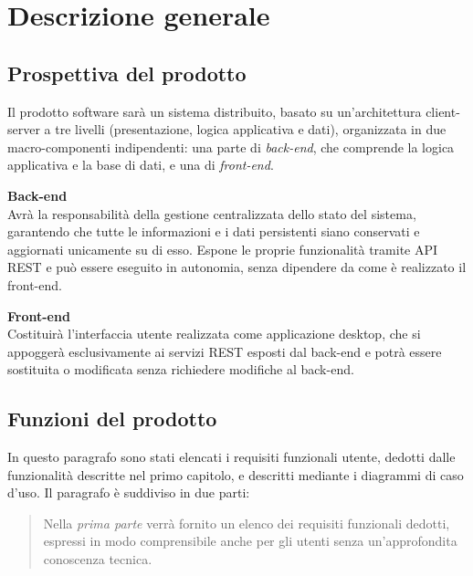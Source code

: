 \chapter{Descrizione generale} %


\section{Prospettiva del prodotto}

Il prodotto software sarà un sistema distribuito, basato su un'architettura client-server a tre livelli (presentazione, logica applicativa e dati), organizzata in due macro-componenti indipendenti: una parte di \textit{back-end}, che comprende la logica applicativa e la base di dati, e una di \textit{front-end}. 

\textbf{Back-end} \\
Avrà la responsabilità della gestione centralizzata dello stato del sistema, garantendo che tutte le informazioni e i dati persistenti siano conservati e aggiornati unicamente su di esso. Espone le proprie funzionalità tramite API REST e può essere eseguito in autonomia, senza dipendere da come è realizzato il front-end.

\textbf{Front-end} \\
Costituirà l'interfaccia utente realizzata come applicazione desktop, che si appoggerà esclusivamente ai servizi REST esposti dal back-end e potrà essere sostituita o modificata senza richiedere modifiche al back-end.

\section{Funzioni del prodotto}
In questo paragrafo sono stati elencati i requisiti funzionali utente, dedotti dalle funzionalità descritte nel primo capitolo, e descritti mediante i diagrammi di caso d'uso.
Il paragrafo è suddiviso in due parti:

\begin{quote}
Nella \textit{prima parte} verrà fornito un elenco dei requisiti funzionali dedotti, espressi in modo comprensibile anche per gli utenti senza un'approfondita conoscenza tecnica.     
\end{quote}

